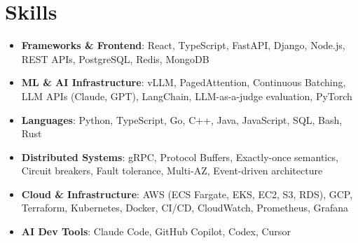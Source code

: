 \documentclass[letterpaper,11pt]{article}
\newcommand{\resumeSubHeadingListStart}{\begin{itemize}[leftmargin=0.15in, label={}]}
\newcommand{\resumeSubHeadingListEnd}{\end{itemize}}
\newcommand{\resumeSkillHeading}[2]{%
  \item\small{\textbf{#1}: #2 \vspace{-9pt}}%
}
\begin{document}
\section{Skills}
  \resumeSubHeadingListStart
    \resumeSkillHeading{Frameworks \& Frontend}{React, TypeScript, FastAPI, Django, Node.js, REST APIs, PostgreSQL, Redis, MongoDB}
    \resumeSkillHeading{ML \& AI Infrastructure}{vLLM, PagedAttention, Continuous Batching, LLM APIs (Claude, GPT), LangChain, LLM-as-a-judge evaluation, PyTorch}
    \resumeSkillHeading{Languages}{Python, TypeScript, Go, C++, Java, JavaScript, SQL, Bash, Rust}
    \resumeSkillHeading{Distributed Systems}{gRPC, Protocol Buffers, Exactly-once semantics, Circuit breakers, Fault tolerance, Multi-AZ, Event-driven architecture}
    \resumeSkillHeading{Cloud \& Infrastructure}{AWS (ECS Fargate, EKS, EC2, S3, RDS), GCP, Terraform, Kubernetes, Docker, CI/CD, CloudWatch, Prometheus, Grafana}
    \resumeSkillHeading{AI Dev Tools}{Claude Code, GitHub Copilot, Codex, Cursor}
  \resumeSubHeadingListEnd
\end{document}
